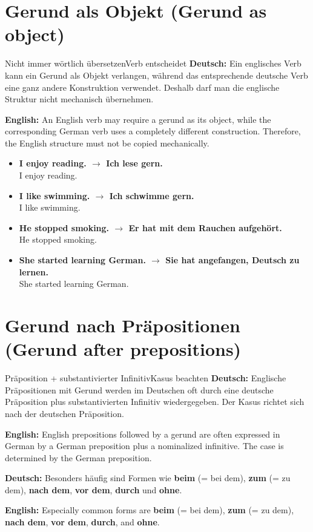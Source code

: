 \documentclass[a4paper,11pt]{article}
\newcommand{\GermanText}[1]{\textbf{Deutsch: }#1\par}
\newcommand{\EnglishText}[1]{{\small\color{SoftGray}\textbf{English: }#1\par}}
\newcommand{\ExampleItem}[2]{\item \textbf{#1}\\{\small\color{SoftGray}#2}}
\begin{document}
\section{Gerund als Objekt \textnormal{(Gerund as object)}}
\begin{grammarentry}{Nicht immer wörtlich übersetzen}{Verb entscheidet}
\GermanText{Ein englisches Verb kann ein Gerund als Objekt verlangen, während das entsprechende deutsche Verb eine ganz andere Konstruktion verwendet. Deshalb darf man die englische Struktur nicht mechanisch übernehmen.}
\EnglishText{An English verb may require a gerund as its object, while the corresponding German verb uses a completely different construction. Therefore, the English structure must not be copied mechanically.}
\end{grammarentry}

\begin{exbox}
\begin{itemize}
\ExampleItem{I enjoy reading. $\rightarrow$ Ich lese gern.}{I enjoy reading.}
\ExampleItem{I like swimming. $\rightarrow$ Ich schwimme gern.}{I like swimming.}
\ExampleItem{He stopped smoking. $\rightarrow$ Er hat mit dem Rauchen aufgehört.}{He stopped smoking.}
\ExampleItem{She started learning German. $\rightarrow$ Sie hat angefangen, Deutsch zu lernen.}{She started learning German.}
\end{itemize}
\end{exbox}

\section{Gerund nach Präpositionen \textnormal{(Gerund after prepositions)}}
\begin{grammarentry}{Präposition + substantivierter Infinitiv}{Kasus beachten}
\GermanText{Englische Präpositionen mit Gerund werden im Deutschen oft durch eine deutsche Präposition plus substantivierten Infinitiv wiedergegeben. Der Kasus richtet sich nach der deutschen Präposition.}
\EnglishText{English prepositions followed by a gerund are often expressed in German by a German preposition plus a nominalized infinitive. The case is determined by the German preposition.}

\GermanText{Besonders häufig sind Formen wie \textbf{beim} (= bei dem), \textbf{zum} (= zu dem), \textbf{nach dem}, \textbf{vor dem}, \textbf{durch} und \textbf{ohne}.}
\EnglishText{Especially common forms are \textbf{beim} (= bei dem), \textbf{zum} (= zu dem), \textbf{nach dem}, \textbf{vor dem}, \textbf{durch}, and \textbf{ohne}.}
\end{grammarentry}
\end{document}
